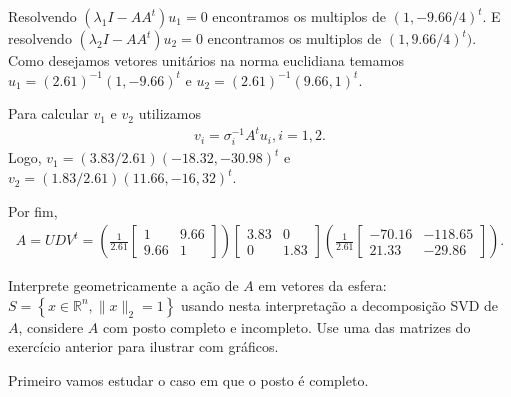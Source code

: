 \documentclass[a4paper,12pt, leqno, answers]{exam}
\begin{document}
\begin{questions}
\begin{parts}
\begin{solution}
            Resolvendo $(\lambda_1 I - A A^t) u_1 = 0$ encontramos os multiplos de $(1, -9.66 / 4)^t$. E resolvendo $(\lambda_2 I - A A^t) u_2 = 0$ encontramos os multiplos de $(1, 9.66 / 4)^t)$. Como desejamos vetores unit\'{a}rios na norma euclidiana temamos $u_1 = (2.61)^{-1} (1, -9.66)^t$ e $u_2 = (2.61)^{-1} (9.66, 1)^t$.

            Para calcular $v_1$ e $v_2$ utilizamos
            \begin{align*}
                v_i = \sigma_i^{-1} A^t u_i, i = 1, 2.
            \end{align*}
            Logo, $v_1 = (3.83 / 2.61) (-18.32, -30.98)^t$ e $v_2 = (1.83 / 2.61) (11.66, -16,32)^t$.

            Por fim,
            \begin{align*}
                A = U D V^t = \left( \frac{1}{2.61} \begin{bmatrix}
                    1 & 9.66 \\
                    9.66 & 1
                \end{bmatrix} \right) \begin{bmatrix}
                    3.83 & 0 \\
                    0 & 1.83
                \end{bmatrix} \left( \frac{1}{2.61} \begin{bmatrix}
                    -70.16 & -118.65 \\
                    21.33 & -29.86
                \end{bmatrix} \right).
            \end{align*}
        \end{solution}
    \end{parts}

     Interprete geometricamente a a\c{c}\~{a}o de $A$ em vetores da esfera: $S = \left\{ x \in \mathbb{R}^n, \| x \|_2 = 1 \right\}$ usando nesta interpreta\c{c}\~{a}o a decomposi\c{c}\~{a}o SVD de $A$, considere $A$ com posto completo e incompleto. Use uma das matrizes do exerc\'{i}cio anterior para ilustrar com gr\'{a}ficos.
    \begin{solution}
        Primeiro vamos estudar o caso em que o posto \'{e} completo.


\end{solution}
\end{questions}
\end{document}
